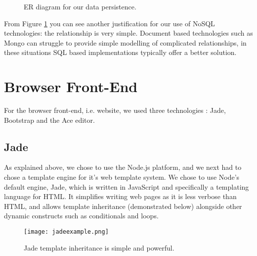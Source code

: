 \begin{figure}[H]
\centering
{}
\caption{ER diagram for our data persistence.}
\label{fig:ER}
\end{figure}

From Figure \ref{fig:ER} you can see another justification for our use of NoSQL technologies: the relationship is very simple. Document based technologies such as Mongo can struggle to provide simple modelling of complicated relationships, in these situations SQL based implementations typically offer a better solution. 

\section{Browser Front-End}

For the browser front-end, i.e. website, we used three technologies : Jade, Bootstrap and the Ace editor.


\subsection{Jade}
As explained above, we chose to use the Node.js platform, and we next had to chose a template engine for it's web template system. We chose to use Node's default engine, Jade\cite{jade}, which is written in JavaScript and specifically a templating language for HTML. It simplifies writing web pages as it is less verbose than HTML, and allows template inheritance (demonstrated below) alongside other dynamic constructs such as conditionals and loops.
\vspace{-2mm}
\begin{figure}[H]
\centering
\texttt{[image: jadeexample.png]}
\caption{Jade template inheritance is simple and powerful.}
\end{figure}

